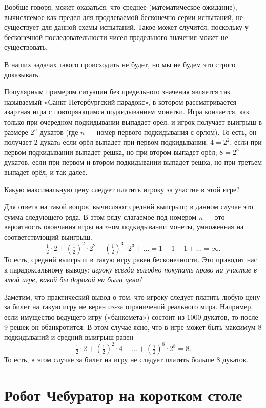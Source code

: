 \documentclass{article}
\begin{document}
Вообще говоря, может оказаться, что среднее (математическое ожидание), вычисляемое как предел для продлеваемой бесконечно серии испытаний, не существует для данной схемы испытаний.
Такое может случится, поскольку у бесконечной последовательности чисел предельного значения может не существовать. 

В наших задачах такого происходить не будет,
но мы не будем это строго доказывать.

Популярным примером ситуации без предельного значения является так называемый «Санкт-Петербургский парадокс», в котором рассматривается азартная игра с повторяющимся подкидыванием монетки. 
Игра кончается, как только при очередном подкидывании выпадает орёл, и игрок получает выигрыш в размере $2^n$ дукатов 
(где $n$ --- номер первого подкидывания с орлом).
То есть, он получает $2$ дукатa если орёл выпадет при первом подкидывании; 
$4=2^2$, если при первом подкидывании выпадет решка, но при втором выпадет орёл; 
$8=2^3$ дукатов, 
если при первом и втором подкидывании выпадет решка, 
но при третьем выпадет орёл, 
и так далее. 

Какую максимальную цену следует платить игроку за участие в этой игре? 

Для ответа на такой вопрос вычисляют средний выигрыш; 
в данном случае это сумма следующего ряда.
В этом ряду слагаемое под номером $n$ 
--- это вероятность окончания игры на $n$-ом подкидывании монеты, умноженная на соответствующий выигрыш.
\[\tfrac12\cdot2+(\tfrac12)^2\cdot2^2+(\tfrac12)^3\cdot2^3+\dots=1+1+1+\dots=\infty.\]
То есть, средний выигрыш в такую игру равен бесконечности.
Это приводит нас к парадоксальному выводу: 
\emph{игроку всегда выгодно покупать право на участие в этой игре, какой бы дорогой ни была цена!}

Заметим, что практический вывод о том, что игроку следует платить любую цену за билет на такую игру не верен из-за ограничений реального мира.
Например, если имущество ведущего игру («банкомёта») состоит из 1000 
дукатов, то после 9 решек он обанкротится.
В этом случае ясно, что в игре может быть максимум 8 подкидываний
и средний выигрыш равен 
\[\tfrac12\cdot2+(\tfrac12)^2\cdot4+\dots+(\tfrac12)^8\cdot 2^8=8.\]
То есть, в этом случае за билет на игру не следует платить больше 8 дукатов.


\section{Робот Чебуратор на коротком столе} 
\end{document}
